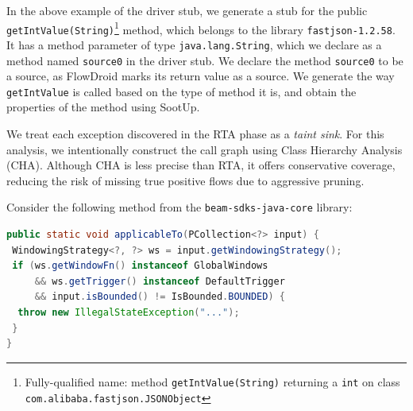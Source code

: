 In the above example of the driver stub, we generate a stub for the public \texttt{getIntValue(String)}\footnote{Fully-qualified name: method \texttt{getIntValue(String)} returning a \texttt{int} on class \texttt{com.alibaba.fastjson.JSONObject}} method, which belongs to the library \texttt{fastjson-1.2.58}. It has a method parameter of type \texttt{java.lang.String}, which we declare as a method named \texttt{source0} in the driver stub. We declare the method \texttt{source0} to be a source, as FlowDroid marks its return value as a source. We generate the way \texttt{getIntValue} is called based on the type of method it is, and obtain the properties of the method using SootUp.

We treat each exception discovered in the RTA phase as a \textit{taint sink}. For this analysis, we intentionally construct the call graph using Class Hierarchy Analysis (CHA). Although CHA is less precise than RTA, it offers conservative coverage, reducing the risk of missing true positive flows due to aggressive pruning.

Consider the following method from the \texttt{beam-sdks-java-core} library:

\begin{lstlisting}[language=Java,breaklines=true,breakatwhitespace=false,basicstyle=\scriptsize\ttfamily]
public static void applicableTo(PCollection<?> input) {
 WindowingStrategy<?, ?> ws = input.getWindowingStrategy();
 if (ws.getWindowFn() instanceof GlobalWindows
     && ws.getTrigger() instanceof DefaultTrigger
     && input.isBounded() != IsBounded.BOUNDED) {
  throw new IllegalStateException("...");
 }
}
\end{lstlisting}

